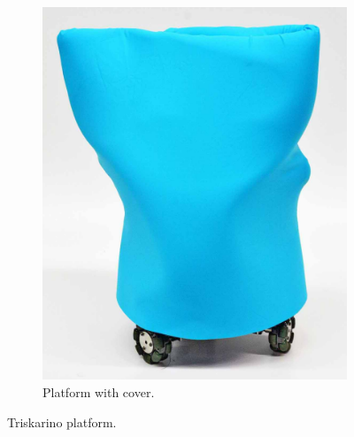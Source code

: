 \begin{figure}[h]
\begin{subfigure}[c]{0.3\textwidth}
	\includegraphics[width=\textwidth]{./Images/Triskar2.jpg}
	\caption{Platform with cover.}
	\label{fig:triskar-cover}
	\end{subfigure}
	\caption{Triskarino platform.}
	\label{fig:robot}
\end{figure} 